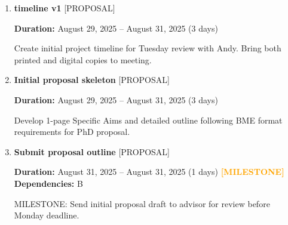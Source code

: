 \documentclass[landscape,a4paper]{article}
\begin{document}
\begin{enumerate}[leftmargin=1.5cm, itemsep=1em, parsep=0.5em]

    \item \textcolor{researchcore}{\textbf{\large timeline v1}}
          \hfill \textcolor{black!60}{\small [PROPOSAL]}
          
          \vspace{0.2em}
          \textcolor{black!70}{\textbf{Duration:} August 29, 2025 -- August 31, 2025 (3 days)}

          \vspace{0.4em}
          \begin{minipage}[t]{0.9\textwidth}
          \textcolor{black!85}{Create initial project timeline for Tuesday review with Andy. Bring both printed and digital copies to meeting.}
          \end{minipage}

    \item \textcolor{researchcore}{\textbf{\large Initial proposal skeleton}}
          \hfill \textcolor{black!60}{\small [PROPOSAL]}
          
          \vspace{0.2em}
          \textcolor{black!70}{\textbf{Duration:} August 29, 2025 -- August 31, 2025 (3 days)}

          \vspace{0.4em}
          \begin{minipage}[t]{0.9\textwidth}
          \textcolor{black!85}{Develop 1-page Specific Aims and detailed outline following BME format requirements for PhD proposal.}
          \end{minipage}

    \item \textcolor{researchcore}{\textbf{\large Submit proposal outline}}
          \hfill \textcolor{black!60}{\small [PROPOSAL]}
          
          \vspace{0.2em}
          \textcolor{black!70}{\textbf{Duration:} August 31, 2025 -- August 31, 2025 (1 days)}
          \textcolor{orange}{\textbf{ [MILESTONE]}}\n          \\[0.2em]\textcolor{black!70}{\textbf{Dependencies:} B}\n
          \vspace{0.4em}
          \begin{minipage}[t]{0.9\textwidth}
          \textcolor{black!85}{MILESTONE: Send initial proposal draft to advisor for review before Monday deadline.}
          \end{minipage}


\end{enumerate}
\end{document}
